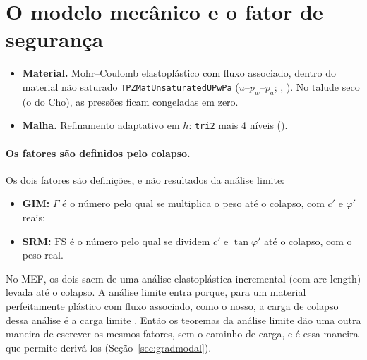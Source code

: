 \documentclass[11pt,a4paper]{article}
\newcommand{\FS}{\mathrm{FS}}
\begin{document}
\section{O modelo mecânico e o fator de segurança}\label{sec:fs}
\begin{itemize}
  \item \textbf{Material.} Mohr--Coulomb elastoplástico com fluxo associado, dentro do material não saturado
    \texttt{TPZMatUnsaturatedUPwPa} ($u$--$p_w$--$p_a$; , ). No talude
    seco (o do Cho), as pressões ficam congeladas em zero.
  \item \textbf{Malha.} Refinamento adaptativo em $h$: \texttt{tri2} mais 4 níveis
    ().
\end{itemize}
\paragraph{Os fatores são definidos pelo colapso.} Os dois fatores são definições, e não resultados da análise limite:
\begin{itemize}
  \item \textbf{GIM:} $\Gamma$ é o número pelo qual se multiplica o peso até o colapso, com $c'$ e $\varphi'$ reais;
  \item \textbf{SRM:} $\FS$ é o número pelo qual se dividem $c'$ e $\tan\varphi'$ até o colapso, com o peso real.
\end{itemize}
No MEF, os dois saem de uma análise elastoplástica incremental (com arc-length) levada até o colapso. A análise limite
entra porque, para um material perfeitamente plástico com fluxo associado, como o nosso, a carga de colapso dessa análise
é a carga limite \citep{drucker1952}. Então os teoremas da análise limite dão uma outra maneira de escrever os mesmos
fatores, sem o caminho de carga, e é essa maneira que permite derivá-los (Seção~\ref{sec:gradmodal}).
\end{document}
